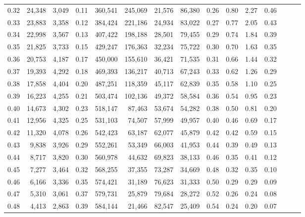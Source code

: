 \begin{tabular}{rrrrrrrrrrrrrrr}
0.32 &  24,348 &  3,049 &  0.11 &  360,541 &  245,069 &   21,576 &   86,380 &  0.26 &  0.80 &  2.27 &      0.46 \\
0.33 &  23,883 &  3,358 &  0.12 &  384,424 &  221,186 &   24,934 &   83,022 &  0.27 &  0.77 &  2.05 &      0.43 \\
0.34 &  22,998 &  3,567 &  0.13 &  407,422 &  198,188 &   28,501 &   79,455 &  0.29 &  0.74 &  1.84 &      0.39 \\
0.35 &  21,825 &  3,733 &  0.15 &  429,247 &  176,363 &   32,234 &   75,722 &  0.30 &  0.70 &  1.63 &      0.35 \\
0.36 &  20,753 &  4,187 &  0.17 &  450,000 &  155,610 &   36,421 &   71,535 &  0.31 &  0.66 &  1.44 &      0.32 \\
0.37 &  19,393 &  4,292 &  0.18 &  469,393 &  136,217 &   40,713 &   67,243 &  0.33 &  0.62 &  1.26 &      0.29 \\
0.38 &  17,858 &  4,404 &  0.20 &  487,251 &  118,359 &   45,117 &   62,839 &  0.35 &  0.58 &  1.10 &      0.25 \\
0.39 &  16,223 &  4,255 &  0.21 &  503,474 &  102,136 &   49,372 &   58,584 &  0.36 &  0.54 &  0.95 &      0.23 \\
0.40 &  14,673 &  4,302 &  0.23 &  518,147 &   87,463 &   53,674 &   54,282 &  0.38 &  0.50 &  0.81 &      0.20 \\
0.41 &  12,956 &  4,325 &  0.25 &  531,103 &   74,507 &   57,999 &   49,957 &  0.40 &  0.46 &  0.69 &      0.17 \\
0.42 &  11,320 &  4,078 &  0.26 &  542,423 &   63,187 &   62,077 &   45,879 &  0.42 &  0.42 &  0.59 &      0.15 \\
0.43 &   9,838 &  3,926 &  0.29 &  552,261 &   53,349 &   66,003 &   41,953 &  0.44 &  0.39 &  0.49 &      0.13 \\
0.44 &   8,717 &  3,820 &  0.30 &  560,978 &   44,632 &   69,823 &   38,133 &  0.46 &  0.35 &  0.41 &      0.12 \\
0.45 &   7,277 &  3,464 &  0.32 &  568,255 &   37,355 &   73,287 &   34,669 &  0.48 &  0.32 &  0.35 &      0.10 \\
0.46 &   6,166 &  3,336 &  0.35 &  574,421 &   31,189 &   76,623 &   31,333 &  0.50 &  0.29 &  0.29 &      0.09 \\
0.47 &   5,310 &  3,061 &  0.37 &  579,731 &   25,879 &   79,684 &   28,272 &  0.52 &  0.26 &  0.24 &      0.08 \\
0.48 &   4,413 &  2,863 &  0.39 &  584,144 &   21,466 &   82,547 &   25,409 &  0.54 &  0.24 &  0.20 &      0.07 \\

\end{tabular}
